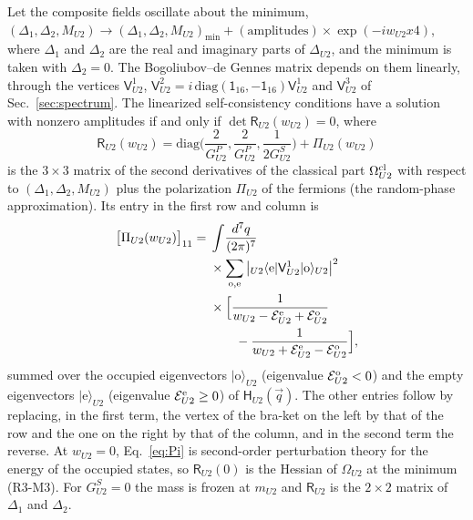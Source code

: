 Let the composite fields oscillate about the minimum,
$(\Delta_1,\Delta_2,M_{U2})\to(\Delta_1,\Delta_2,M_{U2})_{\min}+(\text{amplitudes})\times\exp(-iw_{U2}x4)$,
where $\Delta_1$ and $\Delta_2$ are the real and imaginary parts of $\Delta_{U2}$, and the minimum is
taken with $\Delta_2=0$. The Bogoliubov--de Gennes matrix depends on them linearly, through the
vertices $\mathsf V^1_{U2}$, $\mathsf V^2_{U2}=i\,\mathrm{diag}(\mathsf 1_{16},-\mathsf 1_{16})\mathsf V^1_{U2}$
and $\mathsf V^3_{U2}$ of Sec.~\ref{sec:spectrum}. The linearized self-consistency conditions have a
solution with nonzero amplitudes if and only if $\det\mathsf R_{U2}(w_{U2})=0$, where
\begin{equation}
\mathsf R_{U2}(w_{U2})=\mathrm{diag}\Big(\frac2{G^P_{U2}},\frac2{G^P_{U2}},\frac1{2G^S_{U2}}\Big)+\Pi_{U2}(w_{U2})
\label{eq:R}
\end{equation}
is the $3\times3$ matrix of the second derivatives of the classical part $\Omega^{\rm cl}_{U2}$ with
respect to $(\Delta_1,\Delta_2,M_{U2})$ plus the polarization $\Pi_{U2}$ of the fermions (the
random-phase approximation). Its entry in the first row and
column is
\begin{equation}
\begin{aligned}
\big[\Pi_{U2}(w_{U2})\big]_{11}={}&\int\!\frac{d^7q}{(2\pi)^7}\\
&\times\sum_{\rm o,e}\big|{}_{U2}\langle\mathrm e|\mathsf V^1_{U2}|\mathrm o\rangle_{U2}\big|^2\\
&\times\Big[\frac{1}{w_{U2}-\mathcal E^{\rm e}_{U2}+\mathcal E^{\rm o}_{U2}}\\
&\qquad-\frac{1}{w_{U2}+\mathcal E^{\rm e}_{U2}-\mathcal E^{\rm o}_{U2}}\Big],
\end{aligned}
\label{eq:Pi}
\end{equation}
summed over the occupied eigenvectors $|\mathrm o\rangle_{U2}$ (eigenvalue $\mathcal E^{\rm o}_{U2}<0$)
and the empty eigenvectors $|\mathrm e\rangle_{U2}$ (eigenvalue $\mathcal E^{\rm e}_{U2}\ge0$) of
$\mathsf H_{U2}(\vec q)$. The other entries follow by replacing, in the first term, the vertex of the
bra-ket on the left by that of the row and the one on the right by that of the column, and in the
second term the reverse. At $w_{U2}=0$, Eq.~\eqref{eq:Pi} is second-order perturbation theory for
the energy of the occupied states, so $\mathsf R_{U2}(0)$ is the Hessian of $\Omega_{U2}$ at the
minimum (R3-M3). For $G^S_{U2}=0$ the mass is frozen at $m_{U2}$ and $\mathsf R_{U2}$ is the
$2\times2$ matrix of $\Delta_1$ and $\Delta_2$.

